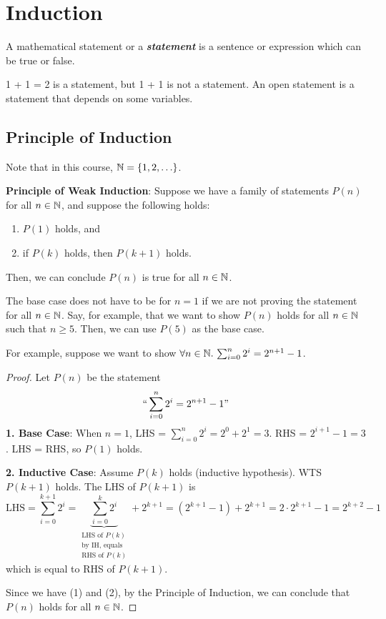 



\section{Induction}

\begin{definition}
    A mathematical statement or a \textit{\textbf{statement}} is a sentence or expression which can be true or false.
\end{definition}

1 + 1 = 2 is a statement, but 1 + 1 is not a statement. An open statement is a statement that depends on some variables.

\subsection{Principle of Induction}

Note that in this course, $\mathbb{N} = \{1,2,\ldots\}$.

\textbf{Principle of Weak Induction}: Suppose we have a family of statements $P(n)$ for all $n \in \mathbb{N}$, and suppose the following holds:
\begin{enumerate}
    \item $P(1)$ holds, and
    \item if $P(k)$ holds, then $P(k+1)$ holds.
\end{enumerate}
Then, we can conclude $P(n)$ is true for all $n \in \mathbb{N}$.

\begin{remark}
    The base case does not have to be for $n=1$ if we are not proving the statement for all $n \in \mathbb{N}$. Say, for example, that we want to show $P(n)$ holds for all $n \in \mathbb{N}$ such that $n \geq 5$. Then, we can use $P(5)$ as the base case.
\end{remark}

For example, suppose we want to show $\forall n \in \mathbb{N}.\, \sum_{i=0}^n 2^i = 2^{n+1} - 1$.

\begin{proof}
    Let $P(n)$ be the statement
    $$
    ``\sum_{i=0}^{n}2^i = 2^{n+1} - 1"
    $$
    \textbf{1. Base Case}: When $n=1$, LHS = $\sum_{i=0}^n 2^i = 2^0 + 2^1 = 3$. RHS = $2^{i+1} - 1 = 3$. LHS = RHS, so $P(1)$ holds.
    
    \textbf{2. Inductive Case}: Assume $P(k)$ holds (inductive hypothesis). WTS $P(k+1)$ holds. The LHS of $P(k+1)$ is
    $$
    \text{LHS} = \sum_{i=0}^{k+1} 2^i = \underbrace{\sum_{i=0}^k 2^i}_{\substack{\text{LHS of $P(k)$} \\ \text{by IH, equals} \\ \text{RHS of $P(k)$}}} + 2^{k+1} = (2^{k+1} - 1) + 2^{k+1} = 2\cdot 2^{k+1} - 1 = 2^{k+2} - 1
    $$
    which is equal to RHS of $P(k+1)$.

    Since we have (1) and (2), by the Principle of Induction, we can conclude that $P(n)$ holds for all $n \in \mathbb{N}$.
\end{proof}

